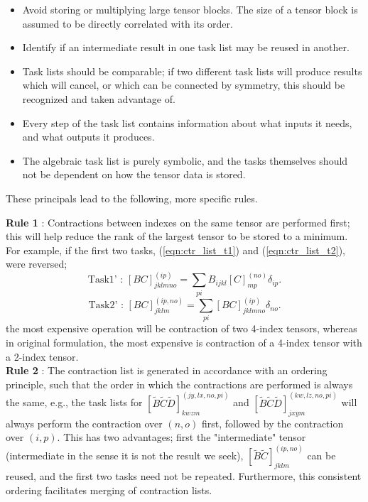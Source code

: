 \begin{itemize}
\item Avoid storing or multiplying large tensor blocks. The size of a tensor block
is assumed to be directly correlated with its order. 
\item Identify if an intermediate result in one task list may be reused in another.
\item Task lists should be comparable; if two different task lists will produce results which will cancel, or which
can be connected by symmetry, this should be recognized and taken advantage of.
\item Every step of the task list contains information about what inputs it needs, and what outputs it produces.
\item The algebraic task list is purely symbolic, and the tasks themselves should not be dependent on
how the tensor data is stored.
\end{itemize}
\noindent These principals lead to the following, more specific rules.

\noindent \textbf{Rule 1} : Contractions between indexes on the same tensor are
performed first; this will help reduce the rank of the largest tensor to be stored to
a minimum. For example, if the first two tasks, (\ref{eqn:ctr_list_t1})  and (\ref{eqn:ctr_list_t2}), were reversed;
\begin{equation*}
\text{Task1' \ : \ \ }
[BC]^{(ip)}_{jklmno} = \sum_{pi} B_{ijkl}[C]_{mp}^{(no)}\delta_{ip}.
\end{equation*}
\begin{equation*}
\text{Task2' \ : \ \ }
[BC]^{(ip,no)}_{jklm} = \sum_{pi} [BC]^{(ip)}_{jklmno}\delta_{no}.
\end{equation*}
the most expensive operation will be contraction of two  4-index tensors, whereas in original formulation, the most expensive is contraction of a 4-index tensor with a 2-index tensor.\\

\noindent \textbf{Rule 2} : The contraction list is generated in accordance with an
ordering principle, such that the order in which the contractions are performed
is always the same, e.g.,  the task lists for $[\tilde{B}\tilde{C}\tilde{D}]^{(jy,lx,no,pi)}_{kwzm}$
and $[\tilde{B}\tilde{C}\tilde{D}]^{(kw,lz,no,pi)}_{jxym}$ will always perform the contraction over
$(n,o)$ first, followed by the contraction over $(i,p)$. This has two 
advantages; first the "intermediate" tensor (intermediate in the sense 
it is not the result we seek), $[\tilde{B}\tilde{C}]^{(ip,no)}_{jklm}$ can be reused, and the first two tasks need not be
repeated. Furthermore, this consistent ordering facilitates merging of contraction lists.\\

